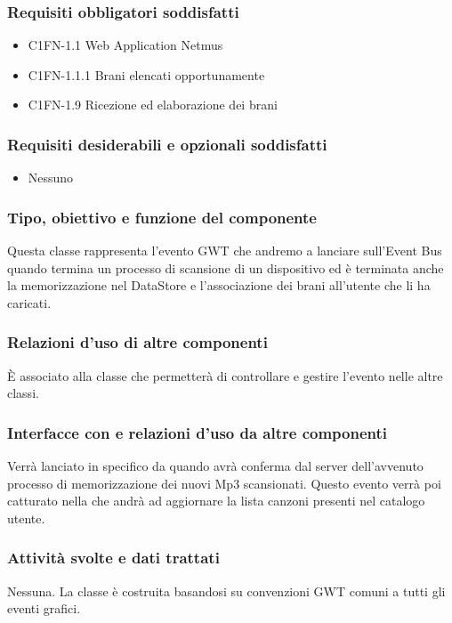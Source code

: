 \subsubsection*{Requisiti obbligatori soddisfatti}
\begin{itemize}
    \item C1FN-1.1 Web Application Netmus
    \item C1FN-1.1.1 Brani elencati opportunamente
    \item C1FN-1.9 Ricezione ed elaborazione dei brani
\end{itemize}
\subsubsection*{Requisiti desiderabili e opzionali soddisfatti}
\begin{itemize}
    \item Nessuno
\end{itemize}
\subsubsection*{Tipo, obiettivo e funzione del componente}
Questa classe rappresenta l'evento GWT che andremo a lanciare sull'Event Bus
quando termina un processo di scansione di un dispositivo ed \`e terminata
anche la memorizzazione nel DataStore e l'associazione dei brani all'utente che
li ha caricati. 
\subsubsection*{Relazioni d'uso di altre componenti}
\`E associato alla classe  che permetter\`a di
controllare e gestire l'evento nelle altre classi.
\subsubsection*{Interfacce con e relazioni d'uso da altre componenti}
Verr\`a lanciato in specifico da  quando avr\`a conferma dal
server dell'avvenuto processo di memorizzazione dei nuovi Mp3 scansionati. Questo
evento verr\`a poi catturato nella  che andr\`a ad
aggiornare la lista canzoni presenti nel catalogo utente.
\subsubsection*{Attivit\`a svolte e dati trattati}
Nessuna. La classe \`e costruita basandosi su convenzioni GWT comuni a tutti gli
eventi grafici.

